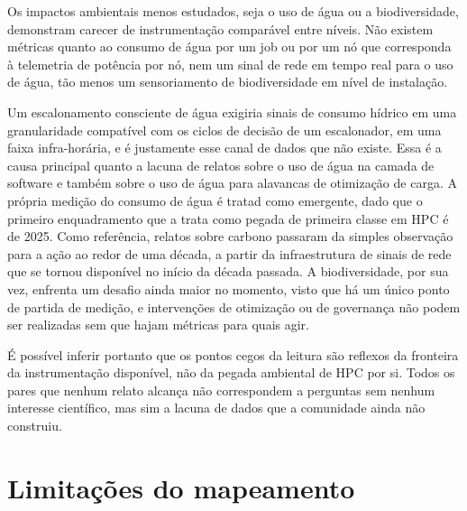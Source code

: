 Os impactos ambientais menos estudados, seja o uso de água ou a biodiversidade, demonstram carecer de instrumentação
comparável entre níveis. Não existem métricas quanto ao consumo de água por um job ou por um nó que corresponda
à telemetria de potência por nó, nem um sinal de rede em tempo real para o uso de água, tão menos um sensoriamento
de biodiversidade em nível de instalação. 

Um escalonamento consciente de água exigiria sinais de consumo hídrico em uma granularidade compatível com os ciclos
de decisão de um escalonador, em uma faixa infra-horária, e é justamente esse canal de dados que não existe. Essa
é a causa principal quanto a lacuna de relatos sobre o uso de água na camada de software e também sobre o uso de água
para alavancas de otimização de carga. A própria medição do consumo de água é tratad como emergente, dado que
o primeiro enquadramento que a trata como pegada de primeira classe em HPC é de 2025. Como referência, relatos sobre carbono
passaram da simples observação para a ação ao redor de uma década, a partir da infraestrutura de sinais de rede
que se tornou disponível no início da década passada. A biodiversidade, por sua vez, enfrenta um desafio ainda maior no momento, visto que há um único ponto de partida de  medição, e
intervenções de otimização ou de governança não podem ser realizadas sem que hajam métricas para quais agir.

É possível inferir portanto que os pontos cegos da leitura são reflexos da fronteira da instrumentação disponível,
não da pegada ambiental de HPC por si. Todos os pares que nenhum relato alcança não correspondem a perguntas 
sem nenhum interesse científico, mas sim a lacuna de dados que a comunidade ainda não construiu.

\section{Limitações do mapeamento}

